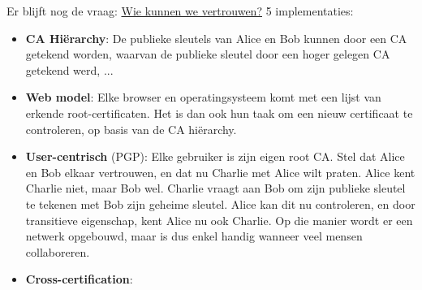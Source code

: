 \documentclass{report}
\begin{document}
	Er blijft nog de vraag: \underline{Wie kunnen we vertrouwen?} 5 implementaties:
	\begin{itemize}
		\item[\info] \textbf{CA Hiërarchy}: De publieke sleutels van Alice en Bob kunnen door een CA getekend worden, waarvan de publieke sleutel door een hoger gelegen CA getekend werd, ...
		\item[\info] \textbf{Web model}: Elke browser en operatingsysteem komt met een lijst van erkende root-certificaten. Het is dan ook hun taak om een nieuw certificaat te controleren, op basis van de CA hiërarchy.
		\item[\info] \textbf{User-centrisch} (PGP): Elke gebruiker is zijn eigen root CA. Stel dat Alice en Bob elkaar vertrouwen, en dat nu Charlie met Alice wilt praten. Alice kent Charlie niet, maar Bob wel. Charlie vraagt aan Bob om zijn publieke sleutel te tekenen met Bob zijn geheime sleutel. Alice kan dit nu controleren, en door transitieve eigenschap, kent Alice nu ook Charlie. Op die manier wordt er een netwerk opgebouwd, maar is dus enkel handig wanneer veel mensen collaboreren.	
		\item[\info] \textbf{Cross-certification}: 
	\end{itemize}
\end{document}
